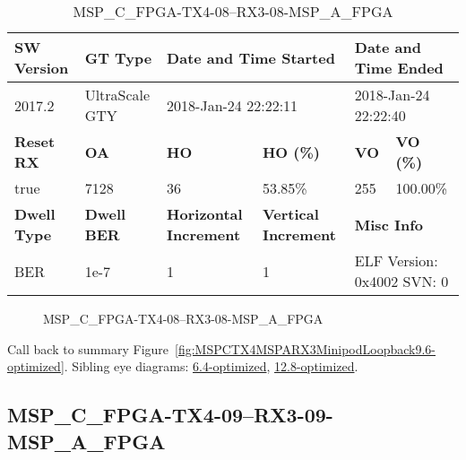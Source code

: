 \begin{table}[h]
\centering
\caption{MSP\_C\_FPGA-TX4-08--RX3-08-MSP\_A\_FPGA}
\label{tab:MSPCFPGATX408RX308MSPAFPGA9.6-optimized}
\begin{tabular}{@{}|l|l|l|l|l|l|@{}}
\toprule
\textbf{SW Version}                & \textbf{GT Type}   & \multicolumn{2}{l|}{\textbf{Date and Time Started}}            & \multicolumn{2}{l|}{\textbf{Date and Time Ended}}        \\ \midrule
2017.2                       & UltraScale GTY          & \multicolumn{2}{l|}{2018-Jan-24 22:22:11}                   & \multicolumn{2}{l|}{2018-Jan-24 22:22:40}               \\ \midrule
\textbf{Reset RX}                  & \textbf{OA} & \textbf{HO}   & \textbf{HO (\%)} & \textbf{VO} & \textbf{VO (\%)} \\ \midrule
true & 7128        & 36          & 53.85\%        & 255        & 100.00\%       \\ \midrule
\textbf{Dwell Type}                & \textbf{Dwell BER} & \textbf{Horizontal Increment} & \textbf{Vertical Increment}    & \multicolumn{2}{l|}{\textbf{Misc Info}}                  \\ \midrule
BER                            & 1e-7        & 1        & 1           & \multicolumn{2}{l|}{ELF Version: 0x4002 SVN: 0}                         \\ \bottomrule
\end{tabular}
\end{table}

\begin{figure}[h]
\caption{MSP\_C\_FPGA-TX4-08--RX3-08-MSP\_A\_FPGA} \label{fig:MSPCFPGATX408RX308MSPAFPGA9.6-optimized}
\end{figure}

Call back to summary Figure~\ref{fig:MSPCTX4MSPARX3MinipodLoopback9.6-optimized}.
Sibling eye diagrams: \hyperref[sec:MSPCFPGATX408RX308MSPAFPGA6.4-optimized]{6.4-optimized}, \hyperref[sec:MSPCFPGATX408RX308MSPAFPGA12.8-optimized]{12.8-optimized}.

\clearpage
\newpage


\subsection{MSP\_C\_FPGA-TX4-09--RX3-09-MSP\_A\_FPGA}\label{sec:MSPCFPGATX409RX309MSPAFPGA9.6-optimized}

